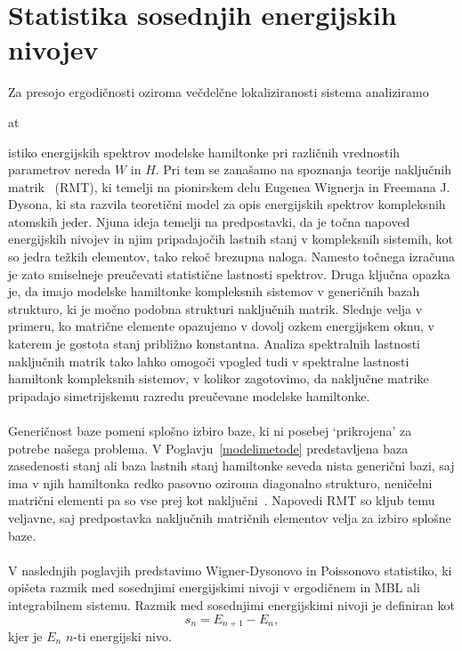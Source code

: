 \section{Statistika sosednjih energijskih nivojev}
Za presojo ergodičnosti oziroma večdelčne lokaliziranosti sistema analiziramo{at

istiko energijskih spektrov modelske hamiltonke pri različnih vrednostih parametrov nereda $W$ in $H$. Pri tem se zanašamo na spoznanja teorije naključnih matrik~\cite{mehta2004random} (RMT), ki temelji na pionirskem delu Eugenea Wignerja in Freemana J. Dysona, ki sta razvila teoretični model za opis energijskih spektrov kompleksnih atomskih jeder. Njuna ideja temelji na predpostavki, da je točna napoved energijskih nivojev in njim pripadajočih lastnih stanj v kompleksnih sistemih, kot so jedra težkih elementov, tako rekoč brezupna naloga. Namesto točnega izračuna je zato smiselneje preučevati statistične lastnosti spektrov. Druga ključna opazka je, da imajo modelske hamiltonke kompleksnih sistemov v generičnih bazah strukturo, ki je močno podobna strukturi naključnih matrik. Slednje velja v primeru, ko matrične elemente opazujemo v dovolj ozkem energijskem oknu, v katerem je gostota stanj približno konstantna. Analiza spektralnih lastnosti naključnih matrik tako lahko omogoči vpogled tudi v spektralne lastnosti hamiltonk kompleksnih sistemov, v kolikor zagotovimo, da naključne matrike pripadajo simetrijskemu razredu preučevane modelske hamiltonke. \\\\
 Generičnost baze pomeni splošno izbiro baze, ki ni posebej `prikrojena' za potrebe našega problema. V Poglavju~\ref{modelimetode} predstavljena baza zasedenosti stanj ali baza lastnih stanj hamiltonke seveda nista generični bazi, saj ima v njih hamiltonka redko pasovno oziroma diagonalno strukturo, neničelni matrični elementi pa so vse prej kot naključni~\cite{d2016quantum}. Napovedi RMT so kljub temu veljavne, saj predpostavka naključnih matričnih elementov velja za izbiro splošne baze. \\\\
 V naslednjih poglavjih predstavimo Wigner-Dysonovo in Poissonovo statistiko, ki opišeta razmik med sosednjimi energijskimi nivoji v ergodičnem in MBL ali integrabilnem sistemu. Razmik med sosednjimi energijskimi nivoji je definiran kot 
 \begin{equation}\label{eq:razmik}
 s_n=E_{n+1}-E_n,
 \end{equation}
 kjer je $E_n$ $n$-ti energijski nivo. \\\\
}
